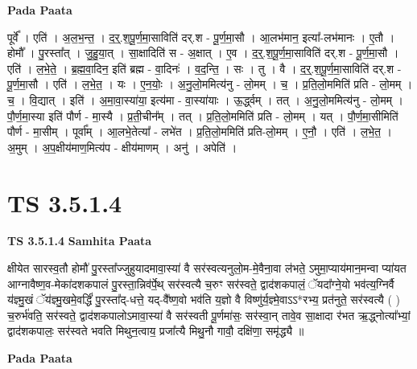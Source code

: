 \documentclass[17pt]{extarticle}
\begin{document}
\textbf{Pada Paata} \newline

पूर्वे᳚ । एति॑ । अ॒ल॒भ॒न्त॒ । द॒र्॒.श॒पू॒र्ण॒मा॒साविति॑ दर्.श - पू॒र्ण॒मा॒सौ । आ॒लभ॑मान॒ इत्या᳚-लभ॑मानः । ए॒तौ । होमौ᳚ । पु॒रस्ता᳚त् । जु॒हु॒या॒त् । सा॒क्षादिति॑ स - अ॒क्षात् । ए॒व । द॒र्॒.श॒पू॒र्ण॒मा॒साविति॑ दर्.श - पू॒र्ण॒मा॒सौ । एति॑ । ल॒भे॒ते॒ । ब्र॒ह्म॒वा॒दिन॒ इति॑ ब्रह्म - वा॒दिनः॑ । व॒द॒न्ति॒ । सः । तु । वै । द॒र्॒.श॒पू॒र्ण॒मा॒साविति॑ दर्.श - पू॒र्ण॒मा॒सौ । एति॑ । ल॒भे॒त॒ । यः । ए॒न॒योः॒ । अ॒नु॒लो॒ममित्य॑नु - लो॒मम् । च॒ । प्र॒ति॒लो॒ममिति॑ प्रति - लो॒मम् । च॒ । वि॒द्यात् । इति॑ । अ॒मा॒वा॒स्या॑या॒ इत्य॑मा - वा॒स्या॑याः । ऊ॒र्द्ध्वम् । तत् । अ॒नु॒लो॒ममित्य॑नु - लो॒मम् । पौ॒र्ण॒मा॒स्या इति॑ पौर्ण - मा॒स्यै । प्र॒ती॒चीन᳚म् । तत् । प्र॒ति॒लो॒ममिति॑ प्रति - लो॒मम् । यत् । पौ॒र्ण॒मा॒सीमिति॑ पौर्ण - मा॒सीम् । पूर्वा᳚म् । आ॒लभे॒तेत्या᳚ - लभे॑त । प्र॒ति॒लो॒ममिति॑ प्रति-लो॒मम् । ए॒नौ॒ । एति॑ । ल॒भे॒त॒ । अ॒मुम् । अ॒प॒क्षीय॑माण॒मित्य॑प - क्षीय॑माणम् । अनु॑ । अपेति॑ ।  \newline





\section{ TS 3.5.1.4 }

\textbf{TS 3.5.1.4 } \newline
\textbf{Samhita Paata} \newline

क्षीयेत सारस्व॒तौ होमौ॑ पु॒रस्ता᳚ज्जुहुयादमावा॒स्या॑ वै सर॑स्वत्यनुलो॒म-मे॒वैना॒वा ल॑भते॒ ऽमुमा॒प्याय॑मान॒मन्वा प्या॑यत आग्नावैष्ण॒व-मेका॑दशकपालं पु॒रस्ता॒न्निव॑र्पे॒थ् सर॑स्वत्यै च॒रुꣳ सर॑स्वते॒ द्वाद॑शकपालं॒ ॅयदा᳚ग्ने॒यो भव॑त्य॒ग्निर्वै य॑ज्ञ्मु॒खं ॅय॑ज्ञ्मु॒खमे॒वर्द्धिं॑ पु॒रस्ता᳚द्-धत्ते॒ यद्-वै᳚ष्ण॒वो भव॑ति य॒ज्ञो वै विष्णु॑र्य॒ज्ञ्मे॒वाऽऽ*रभ्य॒ प्रत॑नुते॒ सर॑स्वत्यै ( ) च॒रुर्भ॑वति॒ सर॑स्वते॒ द्वाद॑शकपालोऽमावा॒स्या॑ वै सर॑स्वती पू॒र्णमा॑सः॒ सर॑स्वा॒न् तावे॒व सा॒क्षादा र॑भत ऋ॒द्ध्नोत्या᳚भ्यां॒ द्वाद॑शकपालः॒ सर॑स्वते भवति मिथुन॒त्वाय॒ प्रजा᳚त्यै मिथु॒नौ गावौ॒ दक्षि॑णा॒ समृ॑द्ध्यै ॥ \newline

\textbf{Pada Paata} \newline
\end{document}
